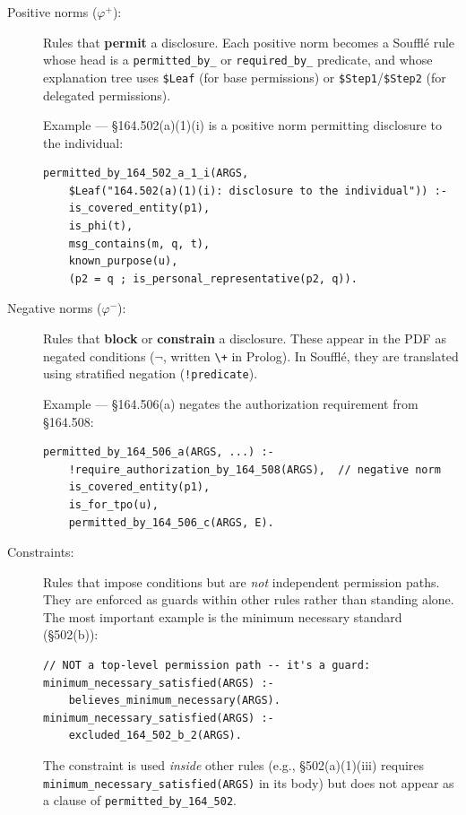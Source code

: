 \documentclass[11pt,letterpaper]{article}
\begin{document}
\begin{description}
  \item[Positive norms ($\varphi^+$):] Rules that \textbf{permit} a disclosure. Each positive norm becomes a Souffl\'{e} rule whose head is a \texttt{permitted\_by\_} or \texttt{required\_by\_} predicate, and whose explanation tree uses \texttt{\$Leaf} (for base permissions) or \texttt{\$Step1}/\texttt{\$Step2} (for delegated permissions).

  Example --- \S 164.502(a)(1)(i) is a positive norm permitting disclosure to the individual:
\begin{lstlisting}[style=soufflestyle]
permitted_by_164_502_a_1_i(ARGS,
    $Leaf("164.502(a)(1)(i): disclosure to the individual")) :-
    is_covered_entity(p1),
    is_phi(t),
    msg_contains(m, q, t),
    known_purpose(u),
    (p2 = q ; is_personal_representative(p2, q)).
\end{lstlisting}

  \item[Negative norms ($\varphi^-$):] Rules that \textbf{block} or \textbf{constrain} a disclosure. These appear in the PDF as negated conditions ($\neg$, written \texttt{\textbackslash+} in Prolog). In Souffl\'{e}, they are translated using stratified negation (\texttt{!predicate}).

  Example --- \S 164.506(a) negates the authorization requirement from \S 164.508:
\begin{lstlisting}[style=soufflestyle]
permitted_by_164_506_a(ARGS, ...) :-
    !require_authorization_by_164_508(ARGS),  // negative norm
    is_covered_entity(p1),
    is_for_tpo(u),
    permitted_by_164_506_c(ARGS, E).
\end{lstlisting}

  \item[Constraints:] Rules that impose conditions but are \emph{not} independent permission paths. They are enforced as guards within other rules rather than standing alone. The most important example is the minimum necessary standard (\S 502(b)):
\begin{lstlisting}[style=soufflestyle]
// NOT a top-level permission path -- it's a guard:
minimum_necessary_satisfied(ARGS) :-
    believes_minimum_necessary(ARGS).
minimum_necessary_satisfied(ARGS) :-
    excluded_164_502_b_2(ARGS).
\end{lstlisting}

  The constraint is used \emph{inside} other rules (e.g., \S 502(a)(1)(iii) requires \texttt{minimum\_necessary\_satisfied(ARGS)} in its body) but does not appear as a clause of \texttt{permitted\_by\_164\_502}.
\end{description}
\end{document}
